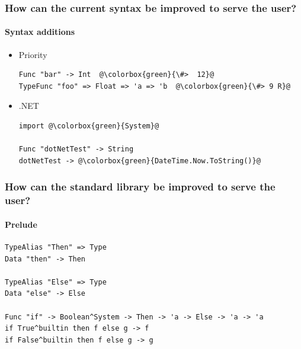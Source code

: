 \documentclass[xetex,serif,aspectratio=169]{beamer}
\begin{document}
\begin{frame}[fragile]
   \frametitle{How can the current syntax be improved to serve the user?}
   \framesubtitle{Syntax additions}

   \begin{itemize}
      \item Priority
         \begin{lstlisting}[escapechar=@]
Func "bar" -> Int  @\colorbox{green}{\#>  12}@
TypeFunc "foo" => Float => 'a => 'b  @\colorbox{green}{\#> 9 R}@
         \end{lstlisting}

      \item .NET
         \begin{lstlisting}[escapechar=@]
import @\colorbox{green}{System}@

Func "dotNetTest" -> String
dotNetTest -> @\colorbox{green}{DateTime.Now.ToString()}@
         \end{lstlisting}
   \end{itemize}
\end{frame}


\begin{frame}[fragile]
   \frametitle{How can the standard library be improved to serve the user?}
   \framesubtitle{Prelude}
   \begin{lstlisting}
TypeAlias "Then" => Type
Data "then" -> Then

TypeAlias "Else" => Type
Data "else" -> Else

Func "if" -> Boolean^System -> Then -> 'a -> Else -> 'a -> 'a
if True^builtin then f else g -> f
if False^builtin then f else g -> g
   \end{lstlisting}
\end{frame}

\end{document}

